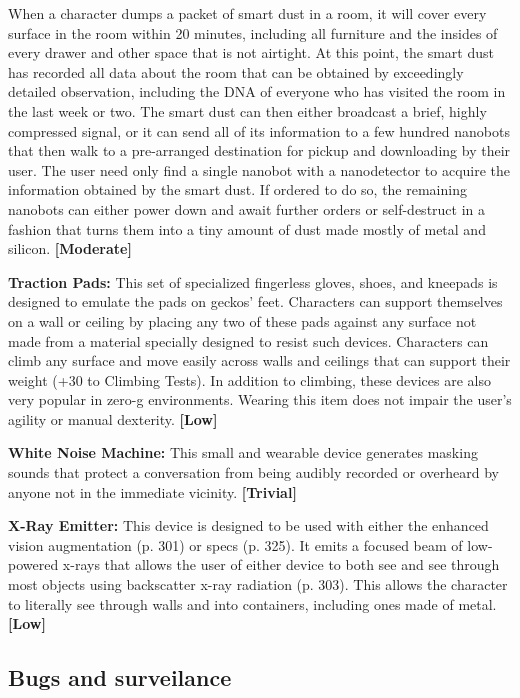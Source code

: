 When a character dumps a packet of smart dust in a room, it will cover every surface in the room within 20 minutes, including all furniture and the insides of every drawer and other space that is not airtight. At this point, the smart dust has recorded all data about the room that can be obtained by exceedingly detailed observation, including the DNA of everyone who has visited the room in the last week or two. The smart dust can then either broadcast a brief, highly compressed signal, or it can send all of its information to a few hundred nanobots that then walk to a pre-arranged destination for pickup and downloading by their user. The user need only find a single nanobot with a nanodetector to acquire the information obtained by the smart dust. If ordered to do so, the remaining nanobots can either power down and await further orders or self-destruct in a fashion that turns them into a tiny amount of dust made mostly of metal and silicon. \textbf{[Moderate]} 

\textbf{Traction Pads:} This set of specialized fingerless gloves, shoes, and kneepads is designed to emulate the pads on geckos’ feet. Characters can support themselves on a wall or ceiling by placing any two of these pads against any surface not made from a material specially designed to resist such devices. Characters can climb any surface and move easily across walls and ceilings that can support their weight (+30 to Climbing Tests). In addition to climbing, these devices are also very popular in zero-g environments. Wearing this item does not impair the user’s agility or manual dexterity. \textbf{[Low]} 

\textbf{White Noise Machine:} This small and wearable device generates masking sounds that protect a conversation from being audibly recorded or overheard by anyone not in the immediate vicinity. \textbf{[Trivial]} 

\textbf{X-Ray Emitter:} This device is designed to be used with either the enhanced vision augmentation (p. 301) or specs (p. 325). It emits a focused beam of low-powered x-rays that allows the user of either device to both see and see through most objects using backscatter x-ray radiation (p. 303). This allows the character to literally see through walls and into containers, including ones made of metal. \textbf{[Low]} 

\subsection{Bugs and surveilance} \label{sec:bugs-surveilance} 

